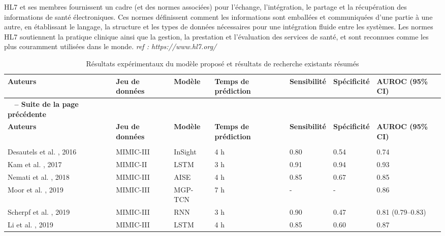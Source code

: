 \documentclass[a4paper,12pt]{article}
\begin{document}
HL7 et ses membres fournissent un cadre (et des normes associées) pour l'échange, l'intégration, le partage et la récupération des informations de santé électroniques. Ces normes définissent comment les informations sont emballées et communiquées d'une partie à une autre, en établissant le langage, la structure et les types de données nécessaires pour une intégration fluide entre les systèmes. Les normes HL7 soutiennent la pratique clinique ainsi que la gestion, la prestation et l'évaluation des services de santé, et sont reconnues comme les plus couramment utilisées dans le monde.
\textit{ref : https://www.hl7.org/}


\renewcommand{\arraystretch}{1.5} %
\begin{longtable}{|>{\small}p{2.5cm}|>{\small}p{3cm}|p{2cm}|p{1.5cm}|p{1.5cm}|p{1.5cm}|p{1.5cm}|}
\caption{Résultats expérimentaux du modèle proposé et résultats de recherche existants résumés}
\label{tab:comparaison_modeles} \\
\hline
\textbf{Auteurs} & \textbf{Jeu de données} & \textbf{Modèle} & \textbf{Temps de prédiction} & \textbf{Sensibilité} & \textbf{Spécificité} & \textbf{AUROC (95\% CI)} \\
\hline
\endfirsthead
\multicolumn{7}{c}%
{{\bfseries \tablename\ \thetable{} -- Suite de la page précédente}} \\
\hline
\textbf{Auteurs} & \textbf{Jeu de données} & \textbf{Modèle} & \textbf{Temps de prédiction} & \textbf{Sensibilité} & \textbf{Spécificité} & \textbf{AUROC (95\% CI)} \\
\hline
\endhead
\hline \multicolumn{7}{|r|}{{Suite sur la page suivante}} \\ \hline
\endfoot
\hline
\endlastfoot
Desautels et al. \cite{desautels2016prediction}, 2016 & MIMIC-III & InSight & 4 h & 0.80 & 0.54 & 0.74 \\
Kam et al. \cite{kam2017learning}, 2017 & MIMIC-II & LSTM & 3 h & 0.91 & 0.94 & 0.93 \\
Nemati et al. \cite{nemati2018interpretable}, 2018 & MIMIC-III & AISE & 4 h & 0.85 & 0.67 & 0.85 \\
Moor et al. \cite{moor2019early}, 2019 & MIMIC-III & MGP-TCN & 7 h & - & - & 0.86 \\
Scherpf et al. \cite{scherpf2019predicting}, 2019 & MIMIC-III & RNN & 3 h & 0.90 & 0.47 & 0.81 \scriptsize{(0.79–0.83)} \\
Li et al. \cite{li2020real}, 2019 & MIMIC-III & LSTM & 4 h & 0.85 & 0.60 & 0.87 \\

\end{longtable}
\end{document}
